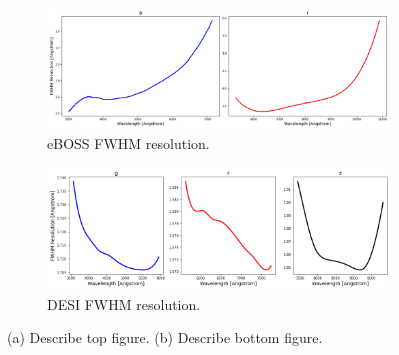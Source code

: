 \begin{figure}[h]
\centering
\begin{subfigure}[b]{0.55\textwidth}
   \includegraphics[width=14cm]{images/specsim/eboss_resolution.png}
   \caption{eBOSS FWHM resolution.}
   \label{fig:eboss_fwhm} 
\label{fig:fwhm}
\end{subfigure}

\begin{subfigure}[b]{0.55\textwidth}
   \includegraphics[width=14cm]{images/specsim/desi_resolution.png}
   \caption{DESI FWHM resolution.}
   \label{fig:desi_fwhm}
\end{subfigure}
\caption[Two numerical solutions]{(a) Describe top figure. (b) Describe bottom figure.}
\end{figure}

